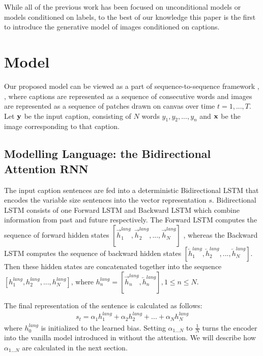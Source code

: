 \documentclass{article} %
\newcommand{\hlang}{h^{lang}}
\newcommand{\icaption}{{\bf{y}}}
\newcommand{\oimage}{{\bf{x}}}
\begin{document}
While all of the previous work has been focused on unconditional models or models conditioned on labels, to the best of our knowledge this paper is the first to introduce the generative model of images conditioned on captions.

\section{Model}
Our proposed model can be viewed as a part of sequence-to-sequence framework \citep{ilya_mt}, \citep{cho_mt}, \citep{nitish_video} where captions are represented as a sequence of consecutive words and images are represented as a sequence of patches drawn on canvas over time $t=1,...,T$. Let $\icaption$ be the input caption, consisting of $N$ words $y_{1}, y_{2}, ..., y_{n}$ and $\oimage$ be the image corresponding to that caption.

\subsection{Modelling Language: the Bidirectional Attention RNN}

The input caption sentences are fed into a deterministic Bidirectional LSTM\cite{} that encodes the variable size sentences into the vector representation $s$. Bidirectional LSTM consists of one Forward LSTM and Backward LSTM which combine information from past and future respectively. The Forward LSTM computes the sequence of forward hidden states $[\overrightarrow{h}^{lang}_{1}, \overrightarrow{h}^{lang}_{2}, ..., \overrightarrow{h}^{lang}_{N}]$ , whereas the Backward LSTM computes the sequence of backward hidden states $[\overleftarrow{h}^{lang}_{1}, \overleftarrow{h}^{lang}_{2}, ..., \overleftarrow{h}^{lang}_{N}]$. Then these hidden states are concatenated together into the sequence $[\hlang_{1}, \hlang_{2}, ..., \hlang_{N}]$, where $\hlang_{n} = [\overrightarrow{h}^{lang}_{n}, \overleftarrow{h}^{lang}_{n}], 1\leq n\leq N$.

The final representation of the sentence is calculated as follows:
\begin{align}
s_{t} = \alpha_{1}\hlang_{1} + \alpha_{2}\hlang_{2} + ... + \alpha_{N}\hlang_{N}
\end{align}
where $\hlang_{0}$ is initialized to the learned bias.
Setting $\alpha_{1...N}$ to $\frac{1}{N}$ turns the encoder into the vanilla model introduced in \citep{cho_mt} without the attention. We will describe how $\alpha_{1...N}$ are calculated in the next section.
\end{document}
